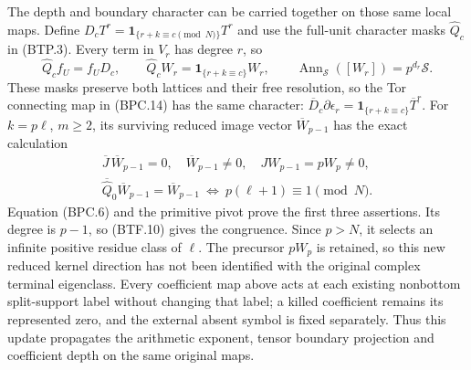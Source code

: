 The depth and boundary character can be
carried together on those same local maps.
Define \(D_cT^r=\mathbf1_{\{r+k\equiv c\pmod N\}}T^r\)
and use the full-unit character masks
\(\widehat Q_c\) in (BTP.3).  Every term
in \(V_r\) has degree \(r\), so
\[
 \widehat Q_cf_U=f_UD_c,\qquad
 \widehat Q_cW_r=\mathbf1_{\{r+k\equiv c\}}W_r,
 \qquad \operatorname{Ann}_{\mathscr S}([W_r])=p^{d_r}\mathscr S.
\tag{BTF.10}\label{eq:btf10}
\]
These masks preserve both lattices and their
free resolution, so the Tor connecting map
in (BPC.14) has the same character:
\(\overline D_c\partial\epsilon_r
=\mathbf1_{\{r+k\equiv c\}}\overline T^r\).
For \(k=p\ell\), \(m\geq2\), its surviving
reduced image vector \(\overline W_{p-1}\)
has the exact calculation
\[
\begin{gathered}
 \overline J\,\overline W_{p-1}=0,
 \quad \overline W_{p-1}\ne0,
 \quad JW_{p-1}=pW_p\ne0,\\
 \overline{\widehat Q}_0\overline W_{p-1}
       =\overline W_{p-1}
 \ \Longleftrightarrow\ p(\ell+1)\equiv1\pmod N.
\end{gathered}
\tag{BTF.11}\label{eq:btf11}
\]
Equation (BPC.6) and the primitive pivot prove
the first three assertions.  Its degree is
\(p-1\), so (BTF.10) gives the congruence.
Since \(p>N\), it selects an infinite
positive residue class of \(\ell\).  The
precursor \(pW_p\) is retained, so this
new reduced kernel direction has not been
identified with the original complex
terminal eigenclass.  Every coefficient
map above acts at each existing nonbottom
split-support label without changing that
label; a killed coefficient remains its
represented zero, and the external absent
symbol is fixed separately.  Thus this
update propagates the arithmetic exponent,
tensor boundary projection and coefficient
depth on the same original maps.

\endgroup

